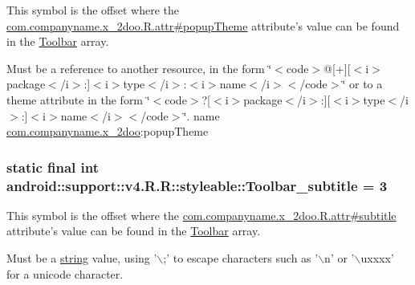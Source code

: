 This symbol is the offset where the \hyperlink{classcom_1_1companyname_1_1x__2doo_1_1_r_1_1attr_d403115dfb9e747c8d3dcd84eb00fe4b}{com.companyname.x\_\-2doo.R.attr\#popupTheme} attribute's value can be found in the \hyperlink{classandroid_1_1support_1_1v4_1_1_r_1_1styleable_0646d71cfbd4a8645c7d805b33e1c574}{Toolbar} array.

Must be a reference to another resource, in the form \char`\"{}$<$code$>$@\mbox{[}+\mbox{]}\mbox{[}$<$i$>$package$<$/i$>$:\mbox{]}$<$i$>$type$<$/i$>$:$<$i$>$name$<$/i$>$$<$/code$>$\char`\"{} or to a theme attribute in the form \char`\"{}$<$code$>$?\mbox{[}$<$i$>$package$<$/i$>$:\mbox{]}\mbox{[}$<$i$>$type$<$/i$>$:\mbox{]}$<$i$>$name$<$/i$>$$<$/code$>$\char`\"{}.  name \hyperlink{namespacecom_1_1companyname_1_1x__2doo}{com.companyname.x\_\-2doo}:popupTheme \hypertarget{classandroid_1_1support_1_1v4_1_1_r_1_1styleable_477282d30e4e1d001d974339d5a3612e}{
\subsubsection[{Toolbar\_\-subtitle}]{\setlength{\rightskip}{0pt plus 5cm}static final int android::support::v4.R.R::styleable::Toolbar\_\-subtitle = 3}}
\label{classandroid_1_1support_1_1v4_1_1_r_1_1styleable_477282d30e4e1d001d974339d5a3612e}


This symbol is the offset where the \hyperlink{classcom_1_1companyname_1_1x__2doo_1_1_r_1_1attr_98394940b75038e43d2df2a9cb49c7b9}{com.companyname.x\_\-2doo.R.attr\#subtitle} attribute's value can be found in the \hyperlink{classandroid_1_1support_1_1v4_1_1_r_1_1styleable_0646d71cfbd4a8645c7d805b33e1c574}{Toolbar} array.

Must be a \hyperlink{classandroid_1_1support_1_1v4_1_1_r_1_1string}{string} value, using '$\backslash$;' to escape characters such as '$\backslash$n' or '$\backslash$uxxxx' for a unicode character. 

